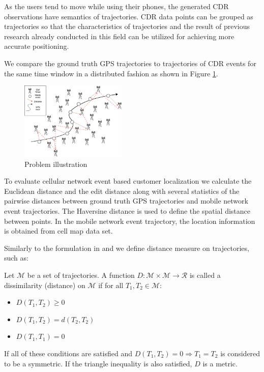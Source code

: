 As the users tend to move while using their phones, the generated CDR observations have semantics of trajectories. CDR data points can be grouped as trajectories so that the characteristics of trajectories and the result of previous research already conducted in this field can be utilized for achieving more accurate positioning.

We compare the ground truth GPS trajectories to trajectories of CDR events for the same time window in a distributed fashion as shown in Figure \ref{fig:problem}. 
\begin{figure}[h]
    \centering
    \includegraphics[width=0.45\textwidth]{images/problem.png}
    \caption{Problem illustration}
    \label{fig:problem}
\end{figure}

To evaluate cellular network event based customer localization we calculate the Euclidean distance and the edit distance along with several statistics of the pairwise distances between ground truth GPS trajectories and mobile network event trajectories. The Haversine distance is used to define the spatial distance between points. In the mobile network event trajectory, the location information is obtained from cell map data set.

Similarly to the formulation in \cite{encyclopedia} and \cite{distance-def} we define distance measure on trajectories, such as:
\begin{definition}
Let $\mathcal{M}$ be a set of trajectories. A function $D :\mathcal{M} \times \mathcal{M} \rightarrow \mathcal{R}$  is called a dissimilarity (distance) on $\mathcal{M}$ if for all $T_{1}, T_{2} \in \mathcal{M}$: 
\begin{itemize}
    \item $D(T_{1},T_{2}) \geqslant 0$
    \item $D(T_{1},T_{2}) = d(T_{2},T_{2})$
    \item $D(T_{1},T_{1}) = 0$
\end{itemize}
If all of these conditions are satisfied and $D(T_{1}, T_{2}) = 0 \Rightarrow  T_{1} = T_{2} $ is considered to be a symmetric. If
the triangle inequality is also satisfied, $D$ is a metric.
\end{definition}

